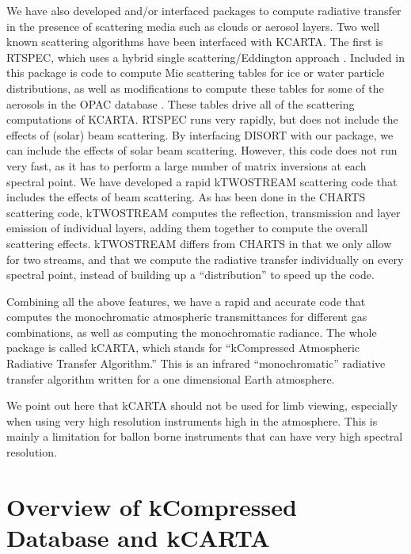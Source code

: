 \documentclass[11pt]{article}
\begin{document}
We have also developed and/or interfaced packages to compute radiative 
transfer in the presence of scattering media such as clouds or aerosol layers.
Two well known scattering  algorithms have been interfaced with 
\textsf{KCARTA}. The first is \textsf{RTSPEC}, which uses a hybrid single 
scattering/Eddington approach \cite{dee:98}. Included in this package is 
code to compute Mie scattering tables for ice or water particle distributions,
as well as modifications to compute these tables for some of the aerosols in 
the \textsf{OPAC} database \cite{hes:98}. These tables drive all of the 
scattering computations of \textsf{KCARTA}. \textsf{RTSPEC} runs very rapidly,
but does not include the effects of (solar) beam scattering. By interfacing 
\textsf{DISORT} \cite{stam:88} with our package, we can include the effects of
solar beam scattering. However, this code does not run very fast, as it has to
perform a large number of matrix inversions at each spectral point. We have 
developed a rapid \textsf{kTWOSTREAM} scattering code that includes the 
effects of beam scattering. As has been done in the \textsf{CHARTS} 
\cite{mon:97} scattering code, \textsf{kTWOSTREAM} computes the reflection, 
transmission and layer emission of individual layers, adding them together to 
compute the overall scattering effects. \textsf{kTWOSTREAM} differs from 
\textsf{CHARTS} in that we only allow for two streams, and that we compute 
the radiative transfer individually on every spectral point, instead of 
building up a ``distribution'' to speed up the code.

Combining all the above features, we have a rapid and accurate code that 
computes the 
monochromatic atmospheric transmittances for different gas combinations, as
well as computing the monochromatic radiance. The whole package is called 
\textsf{kCARTA}, which stands for ``kCompressed Atmospheric Radiative 
Transfer Algorithm.''  This is an infrared ``monochromatic'' radiative 
transfer algorithm written for a one dimensional Earth atmosphere. 

We point out here that \textsf{kCARTA} should not be used for limb viewing, 
especially when using very high resolution instruments high in the
atmosphere. This is mainly a limitation for ballon borne instruments that can 
have very high spectral resolution.

\section{Overview of kCompressed Database and \textsf{kCARTA}}
\end{document}
